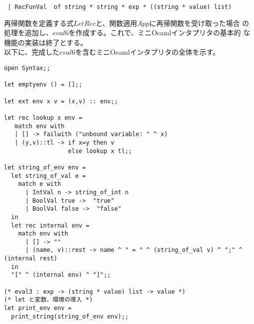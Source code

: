 \documentclass[a4paper,9pt]{jsarticle}
\begin{document}
\begin{lstlisting}
 | RecFunVal  of string * string * exp * ((string * value) list)
\end{lstlisting}

再帰関数を定義する式$LetRec$と、関数適用$App$に再帰関数を受け取った場合
の処理を追加し、$eval6$を作成する。これで、ミニOcamlインタプリタの基本的
な機能の実装は終了とする。\\

以下に、完成した$eval6$を含むミニOcamlインタプリタの全体を示す。

\begin{lstlisting}
open Syntax;;

let emptyenv () = [];;

let ext env x v = (x,v) :: env;;

let rec lookup x env =
   match env with
   | [] -> failwith ("unbound variable: " ^ x)
   | (y,v)::tl -> if x=y then v 
                  else lookup x tl;;

let string_of_env env =
  let string_of_val e =
    match e with
      | IntVal n -> string_of_int n
      | BoolVal true ->  "true"
      | BoolVal false ->  "false"
  in
  let rec internal env = 
    match env with
      | [] -> ""
      | (name, v)::rest -> name ^ " = " ^ (string_of_val v) ^ ";" ^ (internal rest)
  in
  "[" ^ (internal env) ^ "]";;

(* eval3 : exp -> (string * value) list -> value *)
(* let と変数、環境の導入 *)
let print_env env =
  print_string(string_of_env env);;


\end{lstlisting}
\end{document}
